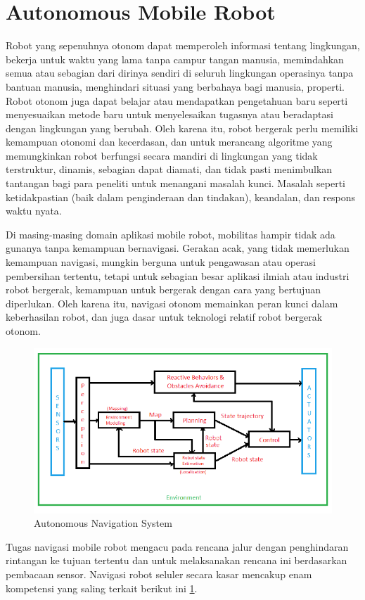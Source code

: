 \section{Autonomous Mobile Robot}
Robot yang sepenuhnya otonom dapat memperoleh informasi tentang lingkungan, bekerja untuk waktu yang lama tanpa campur tangan manusia, memindahkan semua atau sebagian dari dirinya sendiri di seluruh lingkungan operasinya tanpa bantuan manusia, menghindari situasi yang berbahaya bagi manusia, properti. Robot otonom juga dapat belajar atau mendapatkan pengetahuan baru seperti menyesuaikan metode baru untuk menyelesaikan tugasnya atau beradaptasi dengan lingkungan yang berubah. Oleh karena itu, robot bergerak perlu memiliki kemampuan otonomi dan kecerdasan, dan untuk merancang algoritme yang memungkinkan robot berfungsi secara mandiri di lingkungan yang tidak terstruktur, dinamis, sebagian dapat diamati, dan tidak pasti menimbulkan tantangan bagi para peneliti untuk menangani masalah kunci.
Masalah seperti ketidakpastian (baik dalam penginderaan dan tindakan), keandalan, dan respons waktu nyata.

Di masing-masing domain aplikasi mobile robot, mobilitas hampir tidak ada gunanya tanpa kemampuan bernavigasi. Gerakan acak, yang tidak memerlukan kemampuan navigasi, mungkin berguna untuk pengawasan atau operasi pembersihan tertentu, tetapi untuk sebagian besar aplikasi ilmiah atau industri robot bergerak, kemampuan untuk bergerak dengan cara yang bertujuan diperlukan. Oleh karena itu, navigasi otonom memainkan peran kunci dalam keberhasilan robot, dan juga dasar untuk teknologi relatif robot bergerak otonom.

\begin{figure}[H]
	\centering
	\includegraphics[width=0.7\linewidth]{figure/screenshot004}
	\caption{Autonomous Navigation System}
	\label{fig:screenshot004}
\end{figure}

Tugas navigasi mobile robot mengacu pada rencana jalur dengan penghindaran rintangan ke tujuan tertentu dan untuk melaksanakan rencana ini berdasarkan pembacaan sensor. Navigasi robot seluler secara kasar mencakup enam kompetensi yang saling terkait berikut ini \ref{fig:screenshot004}.  

